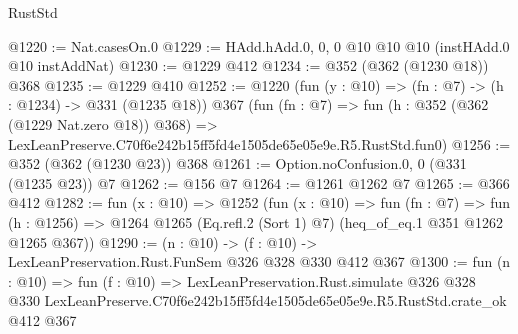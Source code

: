 \begin{lexlean}{RustStd}
\begin{coremodule}
@1220 := Nat.casesOn.{0}
@1229 := HAdd.hAdd.{0, 0, 0} @10 @10 @10 (instHAdd.{0} @10 instAddNat)
@1230 := @1229 @412
@1234 := @352 (@362 (@1230 @18)) @368
@1235 := @1229 @410
@1252 := @1220
    (fun (y : @10) => (fn : @7) -> (h : @1234) -> @331 (@1235 @18))
    @367
    (fun (fn : @7) =>
    fun (h : @352 (@362 (@1229 Nat.zero @18)) @368) =>
    LexLeanPreserve.C70f6e242b15ff5fd4e1505de65e05e9e.R5.RustStd.fun0)
@1256 := @352 (@362 (@1230 @23)) @368
@1261 := Option.noConfusion.{0, 0} (@331 (@1235 @23)) @7
@1262 := @156 @7
@1264 := @1261 @1262 @7
@1265 := @366 @412
@1282 := fun (x : @10) =>
  @1252
    (fun (x : @10) =>
    fun (fn : @7) =>
    fun (h : @1256) => @1264 @1265 (Eq.refl.{2} (Sort 1) @7) (heq_of_eq.{1} @351 @1262 @1265 @367))
@1290 := (n : @10) -> (f : @10) -> LexLeanPreservation.Rust.FunSem @326 @328 @330 @412 @367
@1300 := fun (n : @10) =>
  fun (f : @10) =>
  LexLeanPreservation.Rust.simulate
    @326
    @328
    @330
    LexLeanPreserve.C70f6e242b15ff5fd4e1505de65e05e9e.R5.RustStd.crate_ok
    @412
    @367
\end{coremodule}
\end{lexlean}

